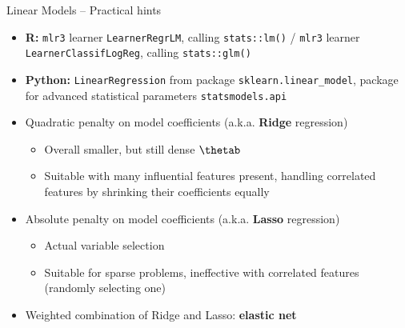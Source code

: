 
\begin{frame}{Linear Models -- Practical hints}

\footnotesize



\begin{itemize}
  \item \textbf{R:} \texttt{mlr3} learner \texttt{LearnerRegrLM}, calling 
  \texttt{stats::lm()} / \texttt{mlr3} learner \texttt{LearnerClassifLogReg}, 
  calling \texttt{stats::glm()}
  \item \textbf{Python:} \texttt{LinearRegression} from package 
  \texttt{sklearn.linear\_model}, package for advanced statistical parameters 
  \texttt{statsmodels.api} 
\end{itemize}

\medskip


\begin{itemize}
  \item Quadratic penalty on model coefficients (a.k.a. \textbf{Ridge} 
  regression)
  \begin{itemize} \footnotesize
    \item Overall smaller, but still dense $\thetab$
    \item Suitable with many influential features present, handling correlated 
    features by shrinking their coefficients equally
  \end{itemize}
  \item Absolute penalty on model coefficients (a.k.a. \textbf{Lasso} 
  regression)
  \begin{itemize} \footnotesize
    \item Actual variable selection
    \item Suitable for sparse problems, ineffective with correlated 
    features (randomly selecting one)
  \end{itemize}  
  \item Weighted combination of Ridge and Lasso: \textbf{elastic net}
\end{itemize}

\end{frame}